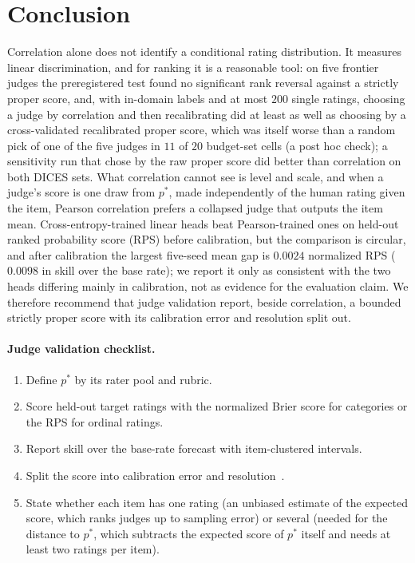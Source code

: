 \section{Conclusion}
Correlation alone does not identify a conditional rating distribution.
It measures linear discrimination, and for ranking it is a reasonable tool: on five frontier judges the preregistered test found no significant rank reversal against a strictly proper score, and, with in-domain labels and at most $200$ single ratings, choosing a judge by correlation and then recalibrating did at least as well as choosing by a cross-validated recalibrated proper score, which was itself worse than a random pick of one of the five judges in $11$ of $20$ budget-set cells (a post hoc check); a sensitivity run that chose by the raw proper score did better than correlation on both DICES sets.
What correlation cannot see is level and scale, and when a judge's score is one draw from $p^*$, made independently of the human rating given the item, Pearson correlation prefers a collapsed judge that outputs the item mean.
Cross-entropy-trained linear heads beat Pearson-trained ones on held-out ranked probability score (RPS) before calibration, but the comparison is circular, and after calibration the largest five-seed mean gap is $0.0024$ normalized RPS ($0.0098$ in skill over the base rate); we report it only as consistent with the two heads differing mainly in calibration, not as evidence for the evaluation claim.
We therefore recommend that judge validation report, beside correlation, a bounded strictly proper score with its calibration error and resolution split out.
\paragraph{Judge validation checklist.}
\begin{enumerate}
\item Define $p^*$ by its rater pool and rubric.
\item Score held-out target ratings with the normalized Brier score for categories or the RPS for ordinal ratings.
\item Report skill over the base-rate forecast with item-clustered intervals.
\item Split the score into calibration error and resolution~\citep{murphy1973vector,brocker2009reliability}.
\item State whether each item has one rating (an unbiased estimate of the expected score, which ranks judges up to sampling error) or several (needed for the distance to $p^*$, which subtracts the expected score of $p^*$ itself and needs at least two ratings per item).
\end{enumerate}
